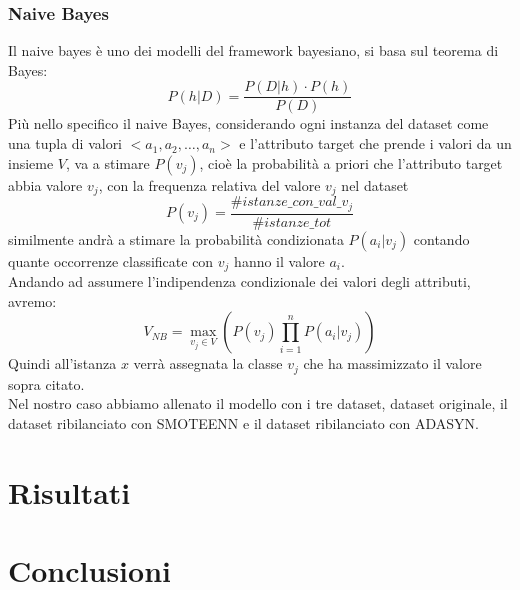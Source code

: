 \documentclass[italian,12pt,a4paper]{article}
\begin{document}
	
	\subsubsection{Naive Bayes}
	
	Il naive bayes è uno dei modelli del framework bayesiano, si basa sul teorema di Bayes:
	$$P(h|D) = \frac{P(D|h)\cdot P(h)}{P(D)}$$
	Più nello specifico il naive Bayes, considerando ogni instanza del dataset come una tupla di valori $<a_1, a_2, \dots, a_n>$ e l'attributo target che prende i valori da un insieme $V$, va a stimare $P(v_j)$, cioè la probabilità a priori che l'attributo target abbia valore $v_j$, con la frequenza relativa del valore $v_j$ nel dataset $$P(v_j) = \frac{\#istanze\_con\_val\_v_j}{\#istanze\_tot}$$ similmente andrà a stimare la probabilità condizionata $P(a_i|v_j)$ contando quante occorrenze classificate con $v_j$ hanno il valore $a_i$. \\
	Andando ad assumere l'indipendenza condizionale dei valori degli attributi, avremo:
	$$V_{NB} = \max_{v_j \in V}(P(v_j)\prod_{i = 1}^{n} P(a_i|v_j))$$
	Quindi all'istanza $x$ verrà assegnata la classe $v_j$ che ha massimizzato il valore sopra citato. \\
	Nel nostro caso abbiamo allenato il modello con i tre dataset, dataset originale, il dataset ribilanciato con SMOTEENN e il dataset ribilanciato con ADASYN.

	\section{Risultati}

	\section{Conclusioni}
	

	
\end{document}
